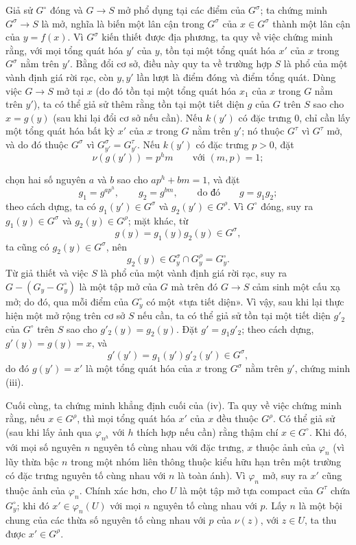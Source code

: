 \documentclass[11pt,twoside,openany]{book}
\numberwithin{equation}{section}
\newcommand{\src}[1]{%
  \phantomsection\hypertarget{src:\fgasourceid:#1}{}%
  \marginpar{\raggedleft\footnotesize\sffamily #1}%
}
\newcommand{\fgasourceid}{unset}
\begin{document}
Giả sử $G^\circ$ đóng và $G\longrightarrow S$ mở phổ dụng tại các điểm của
$G^\sigma$; ta chứng minh $G^\sigma\longrightarrow S$ là mở, nghĩa là biến
một lân cận trong $G^\sigma$ của $x\in G^\sigma$ thành một lân cận của
$y=f(x)$. Vì $G^\sigma$ kiến thiết được địa phương, ta quy về việc chứng minh
rằng, với mọi tổng quát hóa $y'$ của $y$, tồn tại một tổng quát hóa $x'$ của
$x$ trong $G^\sigma$ nằm trên $y'$. Bằng đổi cơ sở, điều này quy ta về trường
hợp $S$ là phổ của một vành định giá rời rạc, còn $y,y'$ lần lượt là điểm đóng
và điểm tổng quát. Dùng việc $G\longrightarrow S$ mở tại $x$ (do đó tồn tại
một tổng quát hóa $x_1$ của $x$ trong $G$ nằm trên $y'$), ta có thể giả sử
thêm rằng tồn tại một tiết diện $g$ của $G$ trên $S$ sao cho $x=g(y)$ (sau
khi lại đổi cơ sở nếu cần). Nếu $k(y')$ có đặc trưng 0, chỉ cần lấy một tổng
quát hóa bất kỳ $x'$ của $x$ trong $G$ nằm trên $y'$; nó thuộc $G^\tau$ vì
$G^\tau$ mở, và do đó thuộc $G^\sigma$ vì
$G_{y'}^\sigma=G_{y'}^\tau$. Nếu $k(y')$ có đặc trưng $p>0$, đặt
\[
\nu(g(y'))=p^hm\qquad\text{với }(m,p)=1 ;
\]
\src{227}
chọn hai số nguyên $a$ và $b$ sao cho $ap^h+bm=1$, và đặt
\[
g_1=g^{ap^h},\qquad g_2=g^{bm},\qquad\text{do đó}\qquad g=g_1g_2 ;
\]
theo cách dựng, ta có $g_1(y')\in G^\sigma$ và
$g_2(y')\in G^\rho$. Vì $G^\circ$ đóng, suy ra
$g_1(y)\in G^\sigma$ và $g_2(y)\in G^\rho$; mặt khác, từ
\[
g(y)=g_1(y)g_2(y)\in G^\sigma,
\]
ta cũng có $g_2(y)\in G^\sigma$, nên
\[
g_2(y)\in G_y^\sigma\cap G_y^\rho=G_y^\circ.
\]
Từ giả thiết và việc $S$ là phổ của một vành định giá rời rạc, suy ra
$G-(G_y-G_y^\circ)$ là một tập mở của $G$ mà trên đó
$G\longrightarrow S$ cảm sinh một cấu xạ mở; do đó, qua mỗi điểm của
$G_y^\circ$ có một «tựa tiết diện». Vì vậy, sau khi lại thực hiện một mở rộng
trên cơ sở $S$ nếu cần, ta có thể giả sử tồn tại một tiết diện $g'_2$ của
$G^\circ$ trên $S$ sao cho $g'_2(y)=g_2(y)$. Đặt $g'=g_1g'_2$; theo cách dựng,
$g'(y)=g(y)=x$, và
\[
g'(y')=g_1(y')g'_2(y')\in G^\sigma,
\]
do đó $g(y')=x'$ là một tổng quát hóa
của $x$ trong $G^\sigma$ nằm trên $y'$, chứng minh (iii).

Cuối cùng, ta chứng minh khẳng định cuối của (iv). Ta quy về việc chứng minh
rằng, nếu $x\in G^\rho$, thì mọi tổng quát hóa $x'$ của $x$ đều thuộc
$G^\rho$. Có thể giả sử (sau khi lấy ảnh qua $\varphi_{n^h}$ với $h$ thích
hợp nếu cần) rằng thậm chí $x\in G^\circ$. Khi đó, với mọi số nguyên $n$
nguyên tố cùng nhau với đặc trưng, $x$ thuộc ảnh của $\varphi_n$ (vì lũy thừa
bậc $n$ trong một nhóm liên thông thuộc kiểu hữu hạn trên một trường có đặc
trưng nguyên tố cùng nhau với $n$ là toàn ánh). Vì $\varphi_n$ mở, suy ra $x'$
cũng thuộc ảnh của $\varphi_n$. Chính xác hơn, cho $U$ là một tập mở tựa
compact của $G^\tau$ chứa $G_y^\circ$; khi đó
$x'\in\varphi_n(U)$ với mọi $n$ nguyên tố cùng nhau với $p$. Lấy $n$ là một
bội chung của các thừa số nguyên tố cùng nhau với $p$ của $\nu(z)$, với
$z\in U$, ta thu được $x'\in G^\rho$.
\end{document}
